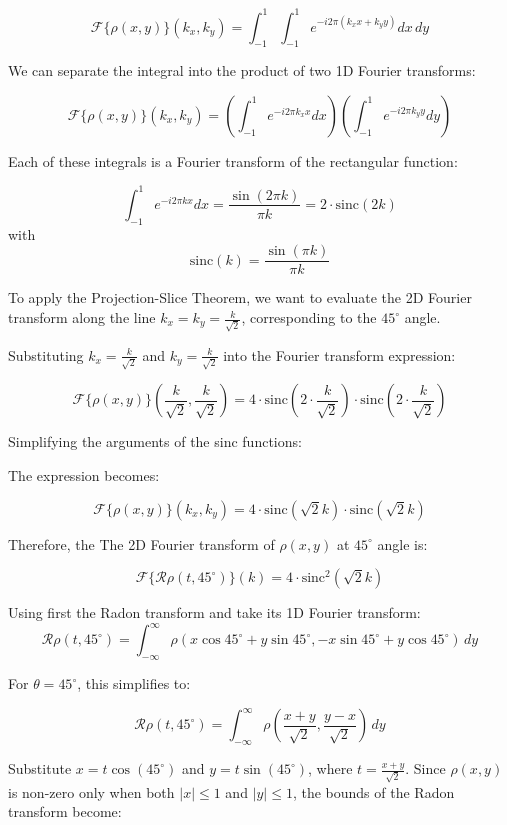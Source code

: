 \documentclass[12pt,twoside]{article}
\begin{document}
\begin{enumerate}
\[
\mathcal{F}\{\rho(x,y)\}(k_x, k_y) = \int_{-1}^{1} \int_{-1}^{1} e^{-i 2\pi(k_x x + k_y y)} dx\, dy
\]

We can separate the integral into the product of two 1D Fourier transforms:

\[
\mathcal{F}\{\rho(x,y)\}(k_x, k_y) = \left(\int_{-1}^{1} e^{-i 2\pi k_x x} dx\right) \left(\int_{-1}^{1} e^{-i 2\pi k_y y} dy\right)
\]

Each of these integrals is a Fourier transform of the rectangular function:

\[
\int_{-1}^{1} e^{-i 2\pi k x} dx = \frac{\sin(2\pi k)}{\pi k} = 2 \cdot \text{sinc}(2k)
\]
with 
\[
 \text{sinc}(k) = \frac{\sin(\pi k)}{\pi k}
\]

To apply the Projection-Slice Theorem, we want to evaluate the 2D Fourier transform along the line \( k_x = k_y = \frac{k}{\sqrt{2}} \), corresponding to the \(45^\circ\) angle.


Substituting \( k_x = \frac{k}{\sqrt{2}} \) and \( k_y = \frac{k}{\sqrt{2}} \) into the Fourier transform expression:

\[
\mathcal{F}\{\rho(x, y)\}\left(\frac{k}{\sqrt{2}}, \frac{k}{\sqrt{2}}\right) = 4 \cdot \text{sinc}\left(2 \cdot \frac{k}{\sqrt{2}}\right) \cdot \text{sinc}\left(2 \cdot \frac{k}{\sqrt{2}}\right)
\]

Simplifying the arguments of the sinc functions:

The expression becomes:

\[
\mathcal{F}\{\rho(x, y)\}(k_x, k_y) = 4 \cdot \text{sinc}\left(\sqrt{2} k\right) \cdot \text{sinc}\left(\sqrt{2} k\right)
\]

Therefore, the The 2D Fourier transform of $\rho(x,y)$  at \(45^\circ\) angle is:

\[
\mathcal{F}\{\mathcal{R}\rho(t, 45^\circ)\}(k) = 4 \cdot  \text{sinc}^2\left(\sqrt{2} k\right) 
\]

Using first the Radon transform and take its 1D Fourier transform:
\[
\mathcal{R}\rho(t, 45^\circ) = \int_{-\infty}^{\infty} \rho(x \cos 45^\circ + y \sin 45^\circ, -x \sin 45^\circ + y \cos 45^\circ) \, dy
\]

For $\theta = 45^\circ$, this simplifies to:

\[
\mathcal{R}\rho(t, 45^\circ) = \int_{-\infty}^{\infty} \rho\left(\frac{x + y}{\sqrt{2}}, \frac{y - x}{\sqrt{2}}\right) \, dy
\]

Substitute $x = t \cos(45^\circ)$ and  $y = t \sin(45^\circ)$,  where  $t = \frac{x+y}{\sqrt{2}}$. Since 
$\rho(x, y)$  is non-zero only when both  $|x| \leq 1$ and $|y| \leq 1$, the bounds of the Radon transform become:


\end{enumerate}
\end{document}
